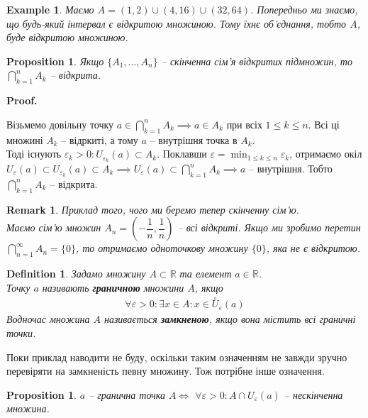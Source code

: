 \documentclass[a4paper, 14pt]{article}
\makeatletter
\def\qed{$\blacksquare$}
\theoremstyle{theoremdd}
\theoremstyle{theoremdd}
\newtheorem{definition}[theorem]{Definition}
\theoremstyle{theoremdd}
\theoremstyle{theoremdd}
\newtheorem{example}[theorem]{Example}
\theoremstyle{theoremdd}
\newtheorem{proposition}[theorem]{Proposition}
\theoremstyle{theoremdd}
\newtheorem{remark}[theorem]{Remark}
\theoremstyle{theoremdd}
\theoremstyle{theoremdd}
\renewenvironment{proof}[1][Proof.\\]{\par
\pushQED{\hfill \qed}%
\normalfont \topsep6\p@\@plus6\p@\relax
\trivlist
\item\relax
{\bfseries
#1\@addpunct{.}}\hspace\labelsep\ignorespaces
}{%
\popQED\endtrivlist\@endpefalse
}
\makeatother
\begin{document}
\begin{example}
Маємо $A = (1,2) \cup (4,16) \cup (32, 64)$. Попередньо ми знаємо, що будь-який інтервал є відкритою множиною. Тому їхнє об'єднання, тобто $A$, буде відкритою множиною.
\end{example}

\begin{proposition}
Якщо $\{A_1,\dots,A_n\}$ -- скінченна сім'я відкритих підмножин, то $\displaystyle \bigcap_{k=1}^n A_k$ -- відкрита.
\end{proposition}

\begin{proof}
Візьмемо довільну точку $a \in \displaystyle\bigcap_{k=1}^n A_k \implies a \in A_k$ при всіх $1 \leq k \leq n$. Всі ці множині $A_k$ -- відркиті, а тому $a$ -- внутрішня точка в $A_k$.\\
Тоді існують $\varepsilon_k > 0: U_{\varepsilon_k}(a) \subset A_k$. Поклавши $\varepsilon = \displaystyle\min_{1 \leq k \leq n} \varepsilon_k$, отримаємо окіл $U_{\varepsilon}(a) \subset U_{\varepsilon_k}(a) \subset A_k \implies U_{\varepsilon}(a) \subset \displaystyle\bigcap_{k=1}^n A_k \implies a$ -- внутрішня. Тобто $\displaystyle\bigcap_{k=1}^n A_k$ -- відкрита.
\end{proof}

\begin{remark}
Приклад того, чого ми беремо тепер скінченну сім'ю.\\
Маємо сім'ю множин $A_n = \left( -\dfrac{1}{n}, \dfrac{1}{n} \right)$ -- всі відкриті. Якщо ми зробимо перетин $\displaystyle\bigcap_{n=1}^\infty A_n = \{0\}$, то отримаємо одноточкову множину $\{0\}$, яка не є відкритою.
\end{remark}

\begin{definition}
Задамо множину $A \subset \mathbb{R}$ та елемент $a \in \mathbb{R}$.\\
Точку $a$ називають \textbf{граничною} множини $A$, якщо
\begin{align*}
\forall \varepsilon > 0: \exists x \in A: x \in \overset{\circ}{U}_{\varepsilon}(a)
\end{align*}
Водночас множина $A$ називається \textbf{замкненою}, якщо вона містить всі граничні точки.
\end{definition}
Поки приклад наводити не буду, оскільки таким означенням не завжди зручно перевіряти на замкненість певну множину. Тож потрібне інше означення.

\begin{proposition}
$a$ -- гранична точка $A \iff$ $\forall \varepsilon > 0: A \cap U_{\varepsilon}(a)$ -- нескінченна множина.
\end{proposition}
\end{document}
